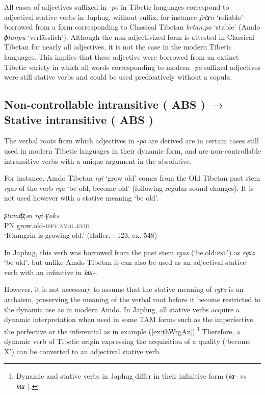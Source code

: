 \documentclass[oneside,a4paper,11pt]{article}
\makeatletter
\newcommand{\ipa}[1]{{\phon\textit{\mbox{#1}}}} %
\newcommand{\refb}[1]{(\ref{#1})}
\def\fakesc#1{%
  \begingroup%
  \xdef\fake@name{\csname\curr@fontshape/\f@size\endcsname}%
  \fontsize{\fontdimen8\fake@name}{\baselineskip}\selectfont%
  \uppercase{#1}%
  \endgroup%
}
\makeatother
\begin{document}
All cases of adjectives suffixed in \ipa{-po} in Tibetic languages correspond to adjectival stative verbs in Japhug, without suffix, for instance \ipa{frtɤn} `reliable' borrowed from a form corresponding to Classical Tibetan \ipa{brtan.po} `stable' (Amdo \ipa{ɸtanpu} `verlässlich'). Although the non-adjectivized form is attested in Classical Tibetan for nearly all adjectives, it is not the case in the modern Tibetic languages. This implies that these adjective were borrowed from an extinct Tibetic variety in which all words corresponding to modern \ipa{-po} suffixed adjectives were still stative verbs and could be used predicatively without a copula.

  
\subsection{Non-controllable intransitive (\fakesc{abs}) $\rightarrow$ Stative intransitive (\fakesc{abs})}
The verbal roots from which adjectives in \ipa{-po} are derived are in certain cases still used in modern Tibetic languages in their dynamic form, and are non-controllable intransitive verbs with a unique argument in the absolutive.

For instance, Amdo Tibetan \ipa{rgi} `grow old' comes from the Old Tibetan past stem \ipa{rgas} of the verb \ipa{rga} `be old, become old' (following regular sound changes). It is not used however with a stative meaning `be old'.

\begin{exe}
\ex \label{ex:rgi}
\gll
\ipa{ʂtamɖʐən} 	\ipa{rgi-ɣokə}  	 \\
PN grow.old-\textsc{ipfv.nvol.evid} \\
\glt `Rtamgrin is growing old.' (Haller, \citeyear{haller04themchen}: 123, ex. 548)
\end{exe}

In Japhug, this verb was borrowed from the past stem \ipa{rgas} (`be.old:\textsc{pst}') as \ipa{rgɤz} `be old', but unlike Amdo Tibetan it can also be used as an adjectival stative verb with an infinitive in \ipa{kɯ-}. 

However, it is not necessary to assume that the stative meaning of \ipa{rgɤz} is an archaism, preserving the meaning of the verbal root before it become restricted to the dynamic use as in modern Amdo. In Japhug, all stative verbs acquire a dynamic interpretation when used in some TAM forms such as the imperfective, the perfective or the inferential as in example \refb{ex:thWrgAz}.\footnote{Dynamic and stative verbs in Japhug differ in their infinitive form (\ipa{kɤ-} vs \ipa{kɯ-}). } Therefore, a dynamic verb of Tibetic origin expressing the acquisition of a quality (`become X') can be converted to an adjectival stative verb.
\end{document}
